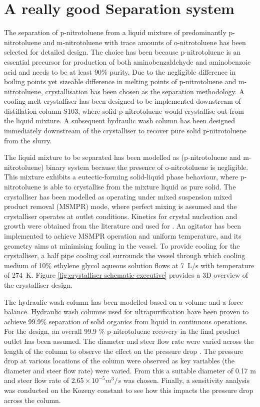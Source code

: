 \section*{A really good Separation system}

The separation of p-nitrotoluene from a liquid mixture of predominantly p-nitrotoluene and m-nitrotoluene with trace amounts of o-nitrotoluene has been selected for detailed design. The choice has been because p-nitrotoluene is an essential precursor for production of both aminobenzaldehyde and aminobenzoic acid and needs to be at least 90\% purity. Due to the negligible difference in boiling points yet sizeable difference in melting points of p-nitrotoluene and m-nitrotoluene, crystallisation has been chosen as the separation methodology. A cooling melt crystalliser has been designed to be implemented downstream of distillation column S103, where solid p-nitrotoluene would crystallise out from the liquid mixture. A subsequent hydraulic wash column has been designed immediately downstream of the crystalliser to recover pure solid p-nitrotoluene from the slurry. 


The liquid mixture to be separated has been modelled as (p-nitrotoluene and m-nitrotoluene) binary system because the presence of o-nitrotoluene is negligible. This mixture exhibits a eutectic-forming solid-liquid phase behaviour, where p-nitrotoluene is able to crystallise from the mixture liquid as pure solid. The crystalliser has been modelled as operating under mixed suspension mixed product removal (MSMPR) mode, where perfect mixing is assumed and the crystalliser operates at outlet conditions. Kinetics for crystal nucleation and growth were obtained from the literature and used for . An agitator has been implemented to achieve MSMPR operation and uniform temperature, and its geometry aims at minimising fouling in the vessel. To provide cooling for the crystalliser, a half pipe cooling coil surrounds the vessel through which cooling medium of 10\% ethylene glycol aqueous solution flows at \SI{7}{L/s} with temperature of \SI{274}{K}. Figure \ref{fig:crystalliser schematic executive} provides a 3D overview of the crystalliser design.


The hydraulic wash column has been modelled based on a volume and a force balance. Hydraulic wash columns used for ultrapurification have been proven to achieve 99.9\% separation of solid organics from liquid in continuous operations. For the design, an overall 99.9 \% p-nitrotoluene recovery in the final product outlet has been assumed. The diameter and steer flow rate were varied across the length of the column to observe the effect on the pressure drop . The pressure drop at various locations of the column were observed as key variables (the diameter and steer flow rate) were varied. From this a suitable diameter of 0.17 m and steer flow rate  of $2.65 \times 10^{-5} m^{3}/s$ was chosen. Finally, a sensitivity analysis was conducted on the Kozeny constant to see how this impacts the pressure drop across the column.


